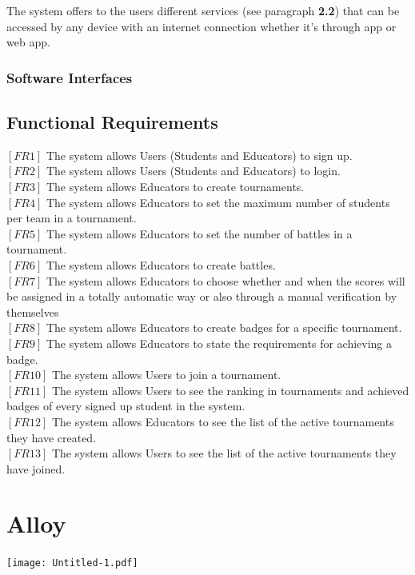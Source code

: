 \documentclass{article}
\begin{document}
The system offers to the users different services (see paragraph \textbf{2.2}) that can be accessed by any device with an internet connection whether it's through app or web app.
                            
\subsubsection{Software Interfaces}



\subsection{Functional Requirements}
$[FR1]$ The system allows Users (Students and Educators) to sign up.\\
$[FR2]$ The system allows Users (Students and Educators) to login.\\
$[FR3]$ The system allows Educators to create tournaments.\\
$[FR4]$ The system allows Educators to set the maximum number of students per team in a tournament.\\
$[FR5]$ The system allows Educators to set the number of battles in a tournament.\\
$[FR6]$ The system allows Educators to create battles.\\
$[FR7]$ The system allows Educators to choose whether and when the scores will be assigned in a totally automatic way or also through a manual verification by themselves\\
$[FR8]$ The system allows Educators to create badges for a specific tournament.\\
$[FR9]$ The system allows Educators to state the requirements for achieving a badge.\\
$[FR10]$ The system allows Users to join a tournament.\\
$[FR11]$ The system allows Users to see the ranking in tournaments and achieved badges of every signed up student in the system.\\
$[FR12]$ The system allows Educators to see the list of the active tournaments they have created.\\
$[FR13]$ The system allows Users to see the list of the active tournaments they have joined.\\

\newpage

\section{Alloy}
\texttt{[image: Untitled-1.pdf]}
\end{document}
